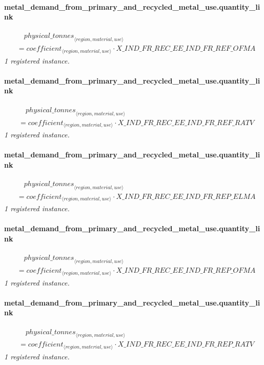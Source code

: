 \documentclass[11pt]{article}
\begin{document}
\paragraph{metal\_demand\_from\_primary\_and\_recycled\_metal\_use.quantity\_link}
\begin{align*}
&\quad {physical\_tonnes}_{\langle region, material, use\rangle}\\
&= coefficient_{\langle region, material, use\rangle} \cdot X\_IND\_FR\_REC\_EE\_IND\_FR\_REF\_OFMA
\end{align*}
\noindent\emph{1 registered instance.}\par
\paragraph{metal\_demand\_from\_primary\_and\_recycled\_metal\_use.quantity\_link}
\begin{align*}
&\quad {physical\_tonnes}_{\langle region, material, use\rangle}\\
&= coefficient_{\langle region, material, use\rangle} \cdot X\_IND\_FR\_REC\_EE\_IND\_FR\_REF\_RATV
\end{align*}
\noindent\emph{1 registered instance.}\par
\paragraph{metal\_demand\_from\_primary\_and\_recycled\_metal\_use.quantity\_link}
\begin{align*}
&\quad {physical\_tonnes}_{\langle region, material, use\rangle}\\
&= coefficient_{\langle region, material, use\rangle} \cdot X\_IND\_FR\_REC\_EE\_IND\_FR\_REP\_ELMA
\end{align*}
\noindent\emph{1 registered instance.}\par
\paragraph{metal\_demand\_from\_primary\_and\_recycled\_metal\_use.quantity\_link}
\begin{align*}
&\quad {physical\_tonnes}_{\langle region, material, use\rangle}\\
&= coefficient_{\langle region, material, use\rangle} \cdot X\_IND\_FR\_REC\_EE\_IND\_FR\_REP\_OFMA
\end{align*}
\noindent\emph{1 registered instance.}\par
\paragraph{metal\_demand\_from\_primary\_and\_recycled\_metal\_use.quantity\_link}
\begin{align*}
&\quad {physical\_tonnes}_{\langle region, material, use\rangle}\\
&= coefficient_{\langle region, material, use\rangle} \cdot X\_IND\_FR\_REC\_EE\_IND\_FR\_REP\_RATV
\end{align*}
\noindent\emph{1 registered instance.}\par
\end{document}
